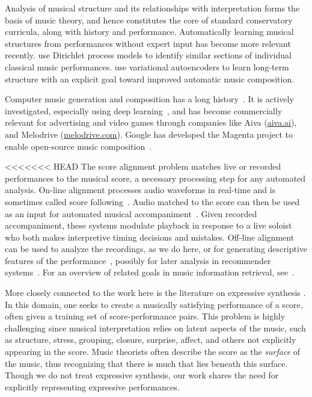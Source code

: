 \documentclass[aoas]{imsart}
\begin{document}
Analysis of musical structure and its relationships with interpretation
forms the basis of music theory, and hence constitutes the core of standard
conservatory curricula, along with history and performance. Automatically learning musical structures
from performances without expert input has become more relevant
recently. \citet{RenDunson2010} use Dirichlet process models to identify
similar sections of individual classical music
performances. \citet{RobertsEngel2018} use variational autoencoders to
learn long-term structure with an explicit goal toward improved
automatic music composition.

Computer music generation and composition has a long
history~\citep{SturmBen-Tal2019,Boulanger-LewandowskiBengio2012,Collins2016,Ariza2005,FlossmannGrachten2013}.
It is actively investigated, especially using deep
learning~\citep{HadjeresPachet2017}, and has become commercially
relevant for advertising and video games through companies like
Aiva (\url{aiva.ai}), and Melodrive (\url{melodrive.com}). Google has
developed the Magenta project to enable open-source music
composition~\citep{RobertsHawthorne2018}.

<<<<<<< HEAD
The score alignment problem matches live or recorded performances to
the musical score, a necessary processing step for any 
automated analysis. On-line alignment processes audio waveforms in
real-time and is sometimes called score
following~\citep{DannenbergRaphael2006,Cont2010,ContSchwarz2007,ArztWidmer2015}. Audio
matched to the score can then be used as an input for automated
musical accompaniment~\citep{Raphael2010,Vercoe1985,Dannenberg1985}.
Given recorded accompaniment, these systems modulate playback
in response to a live soloist who both makes interpretive timing
decisions and mistakes. Off-line alignment~\citep{Earis2007} can be
used to analyze the recordings, as we do here, or for
generating descriptive features of the
performance~\citep{ThickstunHarchaoui2017}, possibly for later
analysis in recommender
systems~\citep{McFeeLanckriet2011,OordDieleman2013}.
For an overview of %
related goals in music information retrieval,
see~\citet{schedl2014music}.

More closely connected to the work here is the literature
on expressive synthesis \citep{Grindlay, Flossman, Widmer, Maezawa,
Bresin, Arcos}.  In this domain, one seeks to create a musically
satisfying performance of a score, often given a training set of
score-performance pairs.
This problem is highly challenging
since musical interpretation relies on latent aspects of the music,
such as structure, stress, grouping, closure, surprise, affect,
and others not explicitly appearing in the score.  Music theorists often
describe the score as the {\em surface} of the music, thus recognizing
that there is much that lies beneath this surface.  Though we do not
treat expressive synthesis, our work shares the need for explicitly
representing expressive performances.%
\end{document}
